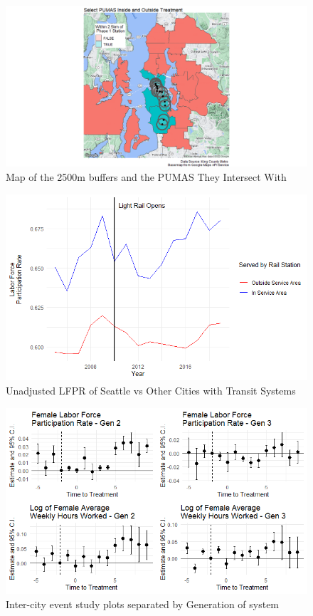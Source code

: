 \documentclass[A4paper,12pt]{article}
\begin{document}
\begin{appendices}
\begin{figure}[h]
\caption{Map of the 2500m buffers and the PUMAS They Intersect With}
\label{maps:buffer}
\centering
\includegraphics[width=1.0\textwidth]{Maps/PUMA_treatment_areas.png}
\end{figure}

\begin{figure}[h]
\caption{Unadjusted LFPR of Seattle vs Other Cities with Transit Systems}
\label{maps:intra}
\centering
\includegraphics[width=1.0\textwidth]{Graphs/intra_graph.png}
\end{figure}

\begin{figure}[h]
\caption{Inter-city event study plots separated by Generation of system}
\label{fig:gen_sep}
\centering
\includegraphics[width=1.0\textwidth]{Graphs/emp_outcome_gensep.png}
\end{figure}


\end{appendices}
\end{document}
